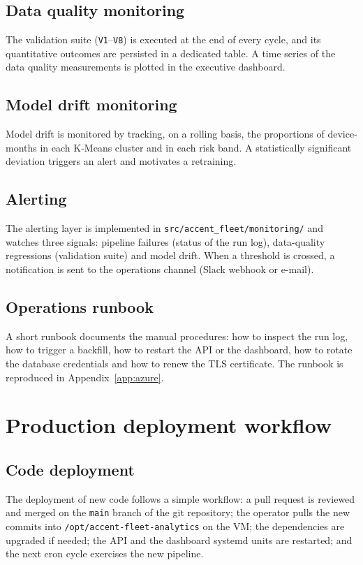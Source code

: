 \subsection{Data quality monitoring}
The validation suite (\texttt{V1}--\texttt{V8}) is executed at the end of every cycle, and its quantitative outcomes are persisted in a dedicated table. A time series of the data quality measurements is plotted in the executive dashboard.

\subsection{Model drift monitoring}
Model drift is monitored by tracking, on a rolling basis, the proportions of device-months in each K-Means cluster and in each risk band. A statistically significant deviation triggers an alert and motivates a retraining.

\subsection{Alerting}
The alerting layer is implemented in \texttt{src/accent\_fleet/monitoring/} and watches three signals: pipeline failures (status of the run log), data-quality regressions (validation suite) and model drift. When a threshold is crossed, a notification is sent to the operations channel (Slack webhook or e-mail).

\subsection{Operations runbook}
A short runbook documents the manual procedures: how to inspect the run log, how to trigger a backfill, how to restart the API or the dashboard, how to rotate the database credentials and how to renew the TLS certificate. The runbook is reproduced in Appendix~\ref{app:azure}.

\section{Production deployment workflow}

\subsection{Code deployment}
The deployment of new code follows a simple workflow: a pull request is reviewed and merged on the \texttt{main} branch of the git repository; the operator pulls the new commits into \texttt{/opt/accent-fleet-analytics} on the VM; the dependencies are upgraded if needed; the API and the dashboard systemd units are restarted; and the next cron cycle exercises the new pipeline.

